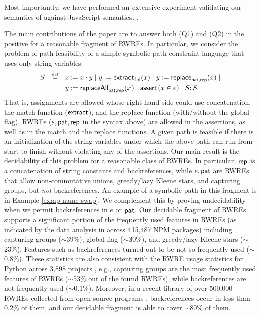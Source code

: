 Most importantly, we have performed an extensive experiment
validating our semantics of \regexp{} against JavaScript semantics. .


The main contributions of the paper are to answer both (Q1) and (Q2) in the
positive for a reasonable fragment of RWREs. In particular, we consider the 
problem of path feasibility of a simple symbolic path constraint language
that uses only string variables:
\[
\begin{array}{l c l}
\smallskip
S & \eqdef  & z:= x \concat y \mid y := \extract_{i, e}(x) \mid  
y := \replace_{\pat, \rep}(x) \mid \\
& & y := \replaceall_{\pat, \rep}(x)   \mid 
 \ASSERT{x \in e} \mid S; S\
\end{array}
\]
That is, assignments are allowed whose right hand side could use concatenation,
the match function ($\mathsf{extract}$), and the replace function (with/without the 
global flag). RWREs ($e,\mathsf{pat},\mathsf{rep}$ in the syntax above) are allowed in the 
assertions, as well as in the match and the replace functions. A given path is
feasible if there is an initialization of the string variables under which the above
path can run from start to finish without violating any of the assertions.
Our main result is the decidability of this problem for a reasonable class of
RWREs. In particular, $\mathsf{rep}$ is a concatenation of string 
constants and backreferences, while $e, \mathsf{pat}$ are RWREs that allow non-commutative
unions, greedy/lazy Kleene stars, and capturing groups, but \emph{not} 
backreferences.  An example of a symbolic path in this fragment is in
Example \ref{exmp-name-swap}.
We complement this by proving undecidability when we permit
backreferences in $e$ or $\mathsf{pat}$.
Our decidable fragment of RWREs supports a significant portion of the 
frequently used features in RWREs (as indicated by the data analysis in
\cite{LMK19} across 415,487 NPM packages) including capturing groups ($\sim$39\%), 
global flag ($\sim$30\%), and greedy/lazy Kleene stars ($\sim$23\%). Features
such as backreferences turned out to be not so frequently used ($\sim$0.8\%).
These statistics are also consistent with the RWRE usage statistics for Python across
3,898 projects \cite{CS16}, e.g., capturing groups are the most frequently used
features of RWREs ($\sim$53\% out of the found RWREs), while backreferences are
not frequently used ($\sim$0.1\%). Moreover, in a recent library of over 500,000 RWREs collected from open-source programs \cite{DMC+19},  backreferences occur in less than 0.2\% of them, and our decidable fragment is able to cover $\sim$80\% of them.

